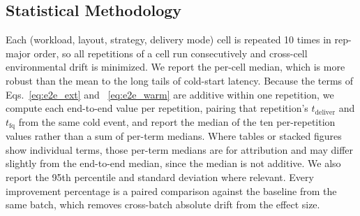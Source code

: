 \documentclass[sigconf, nonacm]{acmart}
\begin{document}

\subsection{Statistical Methodology}\label{sec:stats}
Each (workload, layout, strategy, delivery mode) cell is repeated 10 times in rep-major order, so all repetitions of a cell run consecutively and cross-cell environmental drift is minimized. We report the per-cell median, which is more robust than the mean to the long tails of cold-start latency. Because the terms of Eqs.~\ref{eq:e2e_ext} and ~\ref{eq:e2e_warm} are additive within one repetition, we compute each end-to-end value per repetition, pairing that repetition's $t_{\text{deliver}}$ and $t_{\text{fq}}$ from the same cold event, and report the median of the ten per-repetition values rather than a sum of per-term medians. Where tables or stacked figures show individual terms, those per-term medians are for attribution and may differ slightly from the end-to-end median, since the median is not additive. We also report the 95th percentile and standard deviation where relevant. Every improvement percentage is a paired comparison against the baseline from the same batch, which removes cross-batch absolute drift from the effect size.
\end{document}
